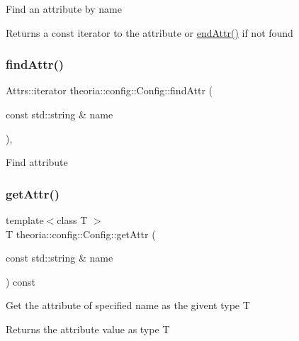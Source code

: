 Find an attribute by name \begin{DoxyReturn}{Returns}
a const iterator to the attribute or \hyperlink{classtheoria_1_1config_1_1Config_adc788e451cd49c6b2c85948bf8f9fb21}{end\+Attr()} if not found 
\end{DoxyReturn}
\mbox{\label{classtheoria_1_1config_1_1Config_a5c3e05b3d7119443b0bcb61eb0404829}} 
\subsubsection{\texorpdfstring{find\+Attr()}{findAttr()}\hspace{0.1cm}{\footnotesize\ttfamily [2/2]}}
{\footnotesize\ttfamily Attrs\+::iterator theoria\+::config\+::\+Config\+::find\+Attr (\begin{DoxyParamCaption}\item[{const std\+::string \&}]{name }\end{DoxyParamCaption})\hspace{0.3cm}{\ttfamily [inline]}, {\ttfamily [protected]}}

Find attribute \mbox{\label{classtheoria_1_1config_1_1Config_a0170adaf1d64ada4eafb43758e520837}} 
\subsubsection{\texorpdfstring{get\+Attr()}{getAttr()}\hspace{0.1cm}{\footnotesize\ttfamily [1/2]}}
{\footnotesize\ttfamily template$<$class T $>$ \\
T theoria\+::config\+::\+Config\+::get\+Attr (\begin{DoxyParamCaption}\item[{const std\+::string \&}]{name }\end{DoxyParamCaption}) const\hspace{0.3cm}{\ttfamily [inline]}}

Get the attribute of specified name as the givent type T \begin{DoxyReturn}{Returns}
the attribute value as type T 
\end{DoxyReturn}

